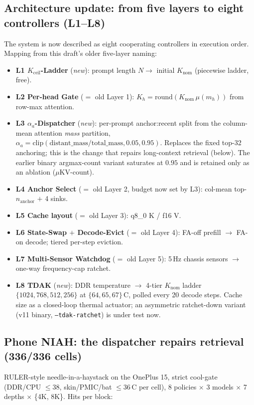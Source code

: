 \documentclass[sigconf, anonymous=false, screen=true]{acmart}
\begin{document}
\subsection{Architecture update: from five layers to eight controllers (L1--L8)}
The system is now described as eight cooperating controllers in execution order. Mapping from this draft's older five-layer naming:
\begin{itemize}[leftmargin=*, itemsep=1pt]
\item \textbf{L1 $K_\mathrm{ceil}$-Ladder} (\emph{new}): prompt length $N \to$ initial $K_\mathrm{nom}$ (piecewise ladder, free).
\item \textbf{L2 Per-head Gate} ($=$ old Layer 1): $K_h = \mathrm{round}(K_\mathrm{nom}\,\mu(m_h))$ from row-max attention.
\item \textbf{L3 $\alpha_a$-Dispatcher} (\emph{new}): per-prompt anchor:recent split from the column-mean attention \emph{mass} partition, $\alpha_a = \mathrm{clip}(\mathrm{distant\_mass}/\mathrm{total\_mass}, 0.05, 0.95)$. Replaces the fixed top-32 anchoring; this is the change that repairs long-context retrieval (below). The earlier binary argmax-count variant saturates at $0.95$ and is retained only as an ablation ($\mu$KV-count).
\item \textbf{L4 Anchor Select} ($=$ old Layer 2, budget now set by L3): col-mean top-$n_\mathrm{anchor}$ $+$ 4 sinks.
\item \textbf{L5 Cache layout} ($=$ old Layer 3): q8\_0 K / f16 V.
\item \textbf{L6 State-Swap $+$ Decode-Evict} ($=$ old Layer 4): FA-off prefill $\to$ FA-on decode; tiered per-step eviction.
\item \textbf{L7 Multi-Sensor Watchdog} ($=$ old Layer 5): 5\,Hz chassis sensors $\to$ one-way frequency-cap ratchet.
\item \textbf{L8 TDAK} (\emph{new}): DDR temperature $\to$ 4-tier $K_\mathrm{nom}$ ladder $\{1024,768,512,256\}$ at $\{64,65,67\}$\,\textdegree C, polled every 20 decode steps. Cache size as a closed-loop thermal actuator; an asymmetric ratchet-down variant (v11 binary, \texttt{--tdak-ratchet}) is under test now.
\end{itemize}

\subsection{Phone NIAH: the dispatcher repairs retrieval (336/336 cells)}
RULER-style needle-in-a-haystack on the OnePlus 15, strict cool-gate (DDR/CPU $\le$38, skin/PMIC/bat $\le$36\,\textdegree C per cell), 8 policies $\times$ 3 models $\times$ 7 depths $\times$ \{4K, 8K\}. Hits per block:
\end{document}
